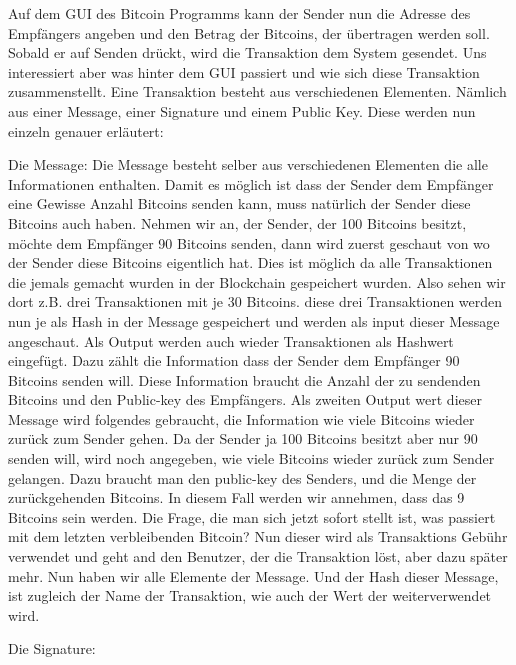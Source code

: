 \noindent
Auf dem GUI des Bitcoin Programms kann der Sender nun die Adresse des Empfängers angeben und den Betrag der Bitcoins, der übertragen werden soll.
Sobald er auf Senden drückt, wird die Transaktion dem System gesendet. Uns interessiert aber was hinter dem GUI passiert und wie sich diese Transaktion zusammenstellt.
Eine Transaktion besteht aus verschiedenen Elementen. Nämlich aus einer Message, einer Signature und einem Public Key. Diese werden nun einzeln genauer erläutert:

\noindent
Die Message:
Die Message besteht selber aus verschiedenen Elementen die alle Informationen enthalten. Damit es möglich ist dass der Sender dem Empfänger eine Gewisse Anzahl Bitcoins senden kann, muss natürlich
der Sender diese Bitcoins auch haben. Nehmen wir an, der Sender, der 100 Bitcoins besitzt, möchte dem Empfänger 90 Bitcoins senden, dann wird zuerst geschaut von wo der Sender diese Bitcoins eigentlich hat. Dies ist möglich da
alle Transaktionen die jemals gemacht wurden in der Blockchain gespeichert wurden. Also sehen wir dort z.B. drei Transaktionen mit je 30 Bitcoins. diese drei Transaktionen werden nun je als Hash in der
Message gespeichert und werden als input dieser Message angeschaut. Als Output werden auch wieder Transaktionen als Hashwert eingefügt. Dazu zählt die Information dass der Sender dem Empfänger 90 Bitcoins senden
will. Diese Information braucht die Anzahl der zu sendenden Bitcoins und den Public-key des Empfängers. Als zweiten Output wert dieser Message wird folgendes gebraucht, die Information wie viele Bitcoins wieder
zurück zum Sender gehen. Da der Sender ja 100 Bitcoins besitzt aber nur 90 senden will, wird noch angegeben, wie viele Bitcoins wieder zurück zum Sender gelangen. Dazu braucht man den public-key des Senders,
und die Menge der zurückgehenden Bitcoins. In diesem Fall werden wir annehmen, dass das 9 Bitcoins sein werden. Die Frage, die man sich jetzt sofort stellt ist, was passiert mit dem letzten verbleibenden
Bitcoin? Nun dieser wird als Transaktions Gebühr verwendet und geht and den Benutzer, der die Transaktion löst, aber dazu später mehr. Nun haben wir alle Elemente der Message. Und der Hash dieser Message, ist
zugleich der Name der Transaktion, wie auch der Wert der weiterverwendet wird.

\noindent
Die Signature:





\newpage
